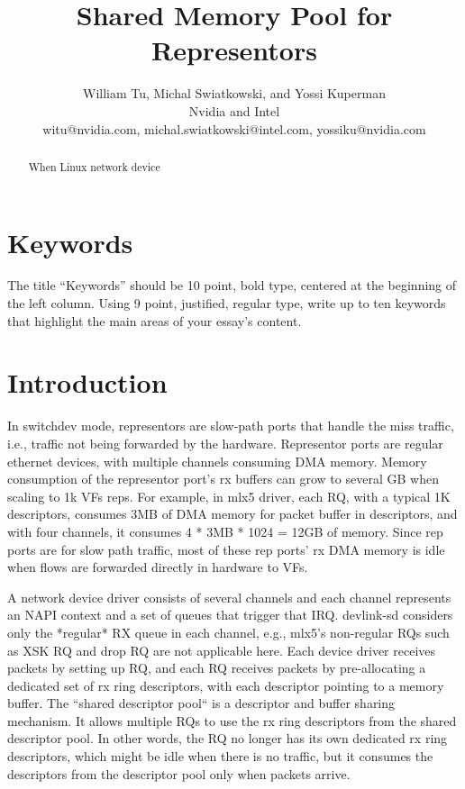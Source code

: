 \documentclass[letterpaper]{article}
\title{Shared Memory Pool for Representors}
\author{William Tu, Michal Swiatkowski, and Yossi Kuperman\\
Nvidia and Intel\\
witu@nvidia.com, michal.swiatkowski@intel.com, yossiku@nvidia.com\\
\newline
\newline
}
\begin{document}
 
\maketitle
\begin{abstract}
When Linux network device 


\end{abstract}

\section{Keywords}

The title ``Keywords'' should be 10 point, bold type, centered at the beginning of the left column. Using 9 point, justified, regular type, write up to ten keywords that highlight the main areas of your essay’s content. 

\section{Introduction}
In switchdev mode, representors are slow-path ports that handle the
miss traffic, i.e., traffic not being forwarded by the hardware.
Representor ports are regular ethernet devices, with multiple channels
consuming DMA memory. Memory consumption of the representor
port's rx buffers can grow to several GB when scaling to 1k VFs reps.
For example, in mlx5 driver, each RQ, with a typical 1K descriptors,
consumes 3MB of DMA memory for packet buffer in descriptors, and with
four channels, it consumes 4 * 3MB * 1024 = 12GB of memory. Since rep
ports are for slow path traffic, most of these rep ports' rx DMA memory
is idle when flows are forwarded directly in hardware to VFs.

A network device driver consists of several channels and each channel
represents an NAPI context and a set of queues that trigger that IRQ.
devlink-sd considers only the *regular* RX queue in each channel,
e.g., mlx5's non-regular RQs such as XSK RQ and drop RQ are not applicable
here. Each device driver receives packets by setting up RQ, and
each RQ receives packets by pre-allocating a dedicated set of rx
ring descriptors, with each descriptor pointing to a memory buffer.
The ``shared descriptor pool`` is a descriptor and buffer sharing
mechanism. It allows multiple RQs to use the rx ring descriptors
from the shared descriptor pool. In other words, the RQ no longer has
its own dedicated rx ring descriptors, which might be idle when there
is no traffic, but it consumes the descriptors from the descriptor
pool only when packets arrive.
\end{document}
